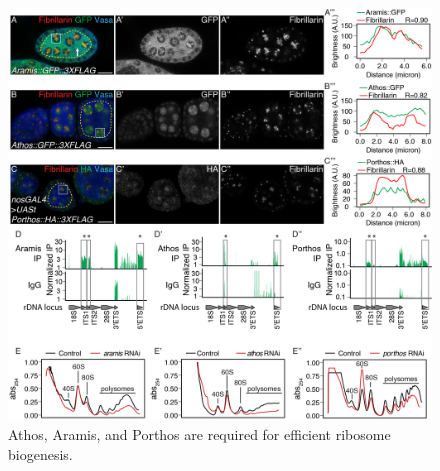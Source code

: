 \documentclass[12pt,oneside]{reedthesis}
\begin{document}
\begin{figure}

{\centering \includegraphics[width=6.5 in,height=8.9375 in]{./figure/Ribosome Biogenesis/Ribosome Biogenesis 2} 

}

\caption[Athos, Aramis, and Porthos are required for efficient ribosome biogenesis.]{Athos, Aramis, and Porthos are required for efficient ribosome biogenesis.}\label{fig:unnamed-chunk-8}
\end{figure}
\end{document}
